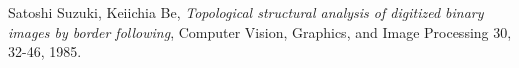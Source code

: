 \begin{thebibliography}{9}

	Satoshi Suzuki, Keiichia Be,
	\emph{Topological structural analysis of digitized binary images by border following},
	Computer Vision, Graphics, and Image Processing 30, 32-46,
	1985.

\end{thebibliography}